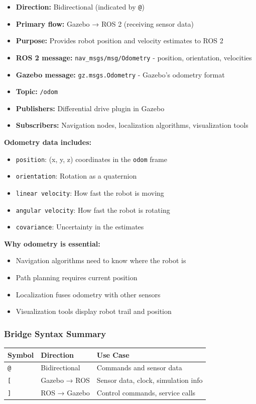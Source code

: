 \begin{itemize}
	\item \textbf{Direction:} Bidirectional (indicated by \texttt{@})
	\item \textbf{Primary flow:} Gazebo → ROS 2 (receiving sensor data)
	\item \textbf{Purpose:} Provides robot position and velocity estimates to ROS 2
	\item \textbf{ROS 2 message:} \texttt{nav\_msgs/msg/Odometry} - position, orientation, velocities
	\item \textbf{Gazebo message:} \texttt{gz.msgs.Odometry} - Gazebo's odometry format
	\item \textbf{Topic:} \texttt{/odom}
	\item \textbf{Publishers:} Differential drive plugin in Gazebo
	\item \textbf{Subscribers:} Navigation nodes, localization algorithms, visualization tools
\end{itemize}

\textbf{Odometry data includes:}
\begin{itemize}
	\item \texttt{position}: (x, y, z) coordinates in the \texttt{odom} frame
	\item \texttt{orientation}: Rotation as a quaternion
	\item \texttt{linear velocity}: How fast the robot is moving
	\item \texttt{angular velocity}: How fast the robot is rotating
	\item \texttt{covariance}: Uncertainty in the estimates
\end{itemize}

\textbf{Why odometry is essential:}
\begin{itemize}
	\item Navigation algorithms need to know where the robot is
	\item Path planning requires current position
	\item Localization fuses odometry with other sensors
	\item Visualization tools display robot trail and position
\end{itemize}

\subsubsection{Bridge Syntax Summary}

\begin{tabular}{|l|l|l|}
\hline
\textbf{Symbol} & \textbf{Direction} & \textbf{Use Case} \\
\hline
\texttt{@} & Bidirectional & Commands and sensor data \\
\texttt{[} & Gazebo → ROS & Sensor data, clock, simulation info \\
\texttt{]} & ROS → Gazebo & Control commands, service calls \\
\hline
\end{tabular}

